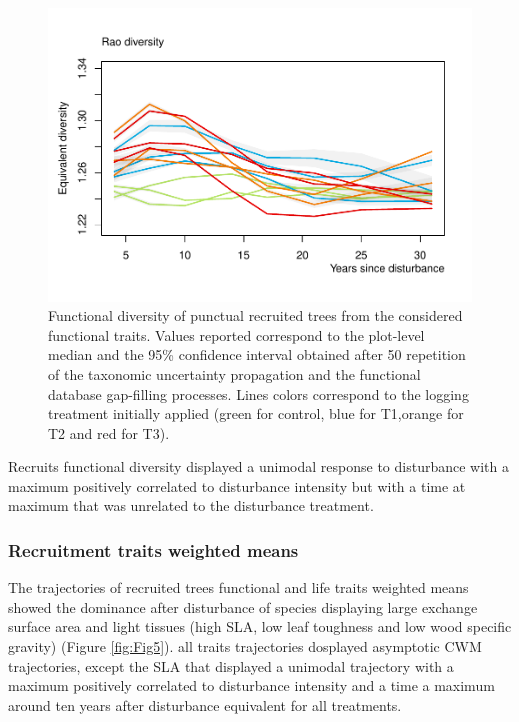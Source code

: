 \documentclass[fleqn,10pt]{ArtEcoFoG} %
\begin{document}
\begin{figure}

{\centering \includegraphics{RecruitmentTrajectories_files/figure-latex/Fig4-1} 

}

\caption{Functional diversity of punctual recruited trees from the considered functional traits. Values reported correspond to the plot-level median and the 95\% confidence interval obtained after 50 repetition of the taxonomic uncertainty propagation and the functional database gap-filling processes. Lines colors correspond to the logging treatment initially applied (green for control, blue for T1,orange for T2 and red for T3).}\label{fig:Fig4}
\end{figure}

Recruits functional diversity displayed a unimodal response to
disturbance with a maximum positively correlated to disturbance
intensity but with a time at maximum that was unrelated to the
disturbance treatment.

\subsubsection{Recruitment traits weighted
means}\label{recruitment-traits-weighted-means}

The trajectories of recruited trees functional and life traits weighted
means showed the dominance after disturbance of species displaying large
exchange surface area and light tissues (high SLA, low leaf toughness
and low wood specific gravity) (Figure \ref{fig:Fig5}). all traits
trajectories dosplayed asymptotic CWM trajectories, except the SLA that
displayed a unimodal trajectory with a maximum positively correlated to
disturbance intensity and a time a maximum around ten years after
disturbance equivalent for all treatments.
\end{document}
